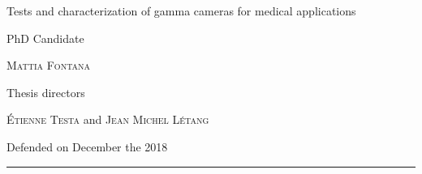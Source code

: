 \begin{titlepage}

\noindent
\textcolor{myColorMainA}{\titlefont Tests and characterization \newline of gamma
cameras for \newline medical applications}\par
\epigraph{PhD Candidate}%
{\textsc{Mattia Fontana}}

\epigraph{Thesis directors}%
{\textsc{\'{E}tienne Testa} and \textsc{Jean Michel L\'{e}tang}}
\null\vfill
\vspace*{1cm}
\noindent
\hfill
\begin{minipage}{0.35\linewidth}
    \begin{flushright}
        \printuniv 
        Defended on December the  2018
    \end{flushright}
\end{minipage}
%
\begin{minipage}{0.02\linewidth}
    \rule{1pt}{125pt}
\end{minipage}
\titlepagedecoration
\end{titlepage}

